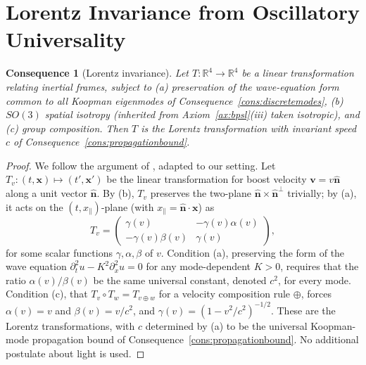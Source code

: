 \documentclass[11pt,twocolumn,a4paper]{article}
\theoremstyle{axiomstyle}
\theoremstyle{conseqstyle}
\newtheorem{consequence}{Consequence}
\theoremstyle{definition}
\theoremstyle{remark}
\newcommand{\Real}{\mathbb{R}}
\begin{document}
\section{Lorentz Invariance from Oscillatory Universality}
\label{sec:lorentz}

\begin{consequence}[Lorentz invariance]
\label{cons:lorentz}
Let $T\colon\Real^{4}\to\Real^{4}$ be a linear transformation relating inertial frames, subject to (a) preservation of the wave-equation form common to all Koopman eigenmodes of Consequence~\ref{cons:discretemodes}, (b) $SO(3)$ spatial isotropy (inherited from Axiom~\ref{ax:bpsl}(iii) taken isotropic), and (c) group composition. Then $T$ is the Lorentz transformation with invariant speed $c$ of Consequence~\ref{cons:propagationbound}.
\end{consequence}

\begin{proof}
We follow the argument of \citet{ignatowsky1910}, adapted to our setting. Let $T_{v}\colon(t,\mathbf{x})\mapsto(t',\mathbf{x}')$ be the linear transformation for boost velocity $\mathbf{v}=v\hat{\mathbf{n}}$ along a unit vector $\hat{\mathbf{n}}$. By (b), $T_{v}$ preserves the two-plane $\hat{\mathbf{n}}\times\hat{\mathbf{n}}^{\perp}$ trivially; by (a), it acts on the $(t,x_{\|})$-plane (with $x_{\|}=\hat{\mathbf{n}}\cdot\mathbf{x}$) as
\begin{equation*}
T_{v}=\begin{pmatrix}\gamma(v)&-\gamma(v)\alpha(v)\\-\gamma(v)\beta(v)&\gamma(v)\end{pmatrix},
\end{equation*}
for some scalar functions $\gamma,\alpha,\beta$ of $v$. Condition (a), preserving the form of the wave equation $\partial_{t}^{2}u-K^{2}\partial_{x}^{2}u=0$ for any mode-dependent $K>0$, requires that the ratio $\alpha(v)/\beta(v)$ be the same universal constant, denoted $c^{2}$, for every mode. Condition (c), that $T_{v}\circ T_{w}=T_{v\oplus w}$ for a velocity composition rule $\oplus$, forces $\alpha(v)=v$ and $\beta(v)=v/c^{2}$, and $\gamma(v)=(1-v^{2}/c^{2})^{-1/2}$. These are the Lorentz transformations, with $c$ determined by (a) to be the universal Koopman-mode propagation bound of Consequence~\ref{cons:propagationbound}. No additional postulate about light is used.
\end{proof}
\end{document}
